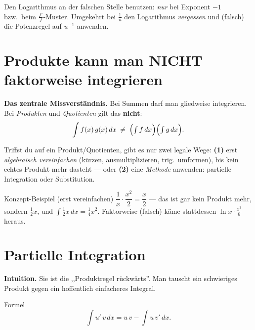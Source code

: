 \documentclass[a4paper,11pt]{article}
\begin{document}
\begin{fehlerbox}
Den Logarithmus an der falschen Stelle benutzen: \emph{nur} bei Exponent $-1$ bzw.\ beim
$\frac{f'}{f}$-Muster. Umgekehrt bei $\frac1u$ den Logarithmus \emph{vergessen} und (falsch)
die Potenzregel auf $u^{-1}$ anwenden.
\end{fehlerbox}

\section{Produkte kann man NICHT faktorweise integrieren}

\textbf{Das zentrale Missverständnis.} Bei Summen darf man gliedweise integrieren. Bei
\emph{Produkten} und \emph{Quotienten} gilt das \textbf{nicht}:
\[
  \int f(x)\,g(x)\,dx \;\neq\; \Bigl(\textstyle\int f\,dx\Bigr)\Bigl(\int g\,dx\Bigr).
\]

\begin{merkbox}
Triffst du auf ein Produkt/Quotienten, gibt es nur zwei legale Wege:
\textbf{(1)} erst \emph{algebraisch vereinfachen} (kürzen, ausmultiplizieren, trig.\ umformen),
bis kein echtes Produkt mehr dasteht — oder \textbf{(2)} eine \emph{Methode} anwenden:
partielle Integration oder Substitution.
\end{merkbox}

\begin{bspbox}{Konzept-Beispiel (erst vereinfachen)}
$\dfrac{1}{x}\cdot\dfrac{x^{2}}{2}=\dfrac{x}{2}$ — das ist gar kein Produkt mehr, sondern
$\frac12 x$, und $\int\frac12 x\,dx=\frac14 x^2$. Faktorweise (falsch) käme stattdessen
$\ln x\cdot\frac{x^3}{6}$ heraus.
\end{bspbox}

\section{Partielle Integration}

\textbf{Intuition.} Sie ist die ,,Produktregel rückwärts''. Man tauscht ein schwieriges Produkt
gegen ein hoffentlich einfacheres Integral.

\begin{satzbox}{Formel}
\[
  \int u'\,v\,dx = u\,v-\int u\,v'\,dx.
\]
\end{satzbox}
\end{document}
